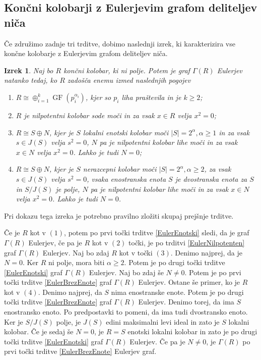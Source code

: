 \documentclass[a4paper, 12pt]{amsart}
\theoremstyle{definition} %
\theoremstyle{plain} %
\newtheorem{izrek}[definicija]{Izrek}
\DeclareMathOperator{\GF}{GF}
\begin{document}
\endproof


\subsection{Končni kolobarji z Eulerjevim grafom deliteljev niča}

Če združimo zadnje tri trditve, dobimo naslednji izrek, ki karakterizira vse končne kolobarje z Eulerjevim grafom deliteljev niča.

\begin{izrek}
\label{EulerGraf}
Naj bo $R$ končni kolobar, ki ni polje. Potem je graf $\Gamma(R)$ Eulerjev natanko tedaj, ko $R$ zadošča enemu izmed naslednjih pogojev
\begin{enumerate}
\item $R \cong \oplus_{i=1}^k \GF(p_i^{\alpha_i})$, kjer so $p_i$ liha praštevila in je $k\ge 2$;
\item $R$ je nilpotentni kolobar sode moči in za vsak $x\in R$ velja $x^2 = 0$;
\item $R\cong S\oplus N$, kjer je $S$ lokalni enotski kolobar moči $|S| = 2^{\alpha}, \alpha \ge 1$ in za vsak $s\in J(S)$ velja $s^2 = 0$, $N$ pa je nilpotentni kolobar lihe moči in za vsak $x\in N$ velja $x^2 = 0$. Lahko je tudi $N=0$;
\item $R\cong S \oplus N$, kjer je $S$ nerazcepni kolobar moči $|S| = 2^{\alpha}, \alpha \ge 2$, za vsak $s\in J(S)$ velja $s^2 = 0$, vsaka enostranska enota $S$ je dvostranska enota za $S$ in $S/J(S)$ je polje, $N$ pa je nilpotentni kolobar lihe moči in za vsak $x\in N$ velja $x^2 = 0$. Lahko je tudi $N=0$.
\end{enumerate} 
\end{izrek}

\proof
Pri dokazu tega izreka je potrebno pravilno zložiti skupaj prejšnje trditve. 

Če je $R$ kot v $(1)$, potem po prvi točki trditve \ref{EulerEnotski} sledi, da je graf $\Gamma(R)$ Eulerjev, če pa je $R$ kot v $(2)$ točki, je po trditvi \ref{EulerNilpotenten} graf $\Gamma(R)$ Eulerjev. Naj bo zdaj $R$ kot v točki $(3)$. Denimo najprej, da je $N=0$. Ker $R$ ni polje, mora biti $\alpha \ge 2$. Potem je po drugi točki trditve \ref{EulerEnotski} graf $\Gamma(R)$ Eulerjev. Naj bo zdaj še $N\neq 0$. Potem je po prvi točki trditve \ref{EulerBrezEnote} graf $\Gamma(R)$ Eulerjev. Ostane še primer, ko je $R$ kot v $(4)$. Denimo najprej, da $S$ nima enostranske enote. Potem je po drugi točki trditve \ref{EulerBrezEnote} graf $\Gamma(R)$ Eulerjev. Denimo torej, da ima $S$ enostransko enoto. Po predpostavki to pomeni, da ima tudi dvostransko enoto. Ker je $S/J(S)$ polje, je $J(S)$ edini maksimalni levi ideal in zato je $S$ lokalni kolobar. Če je sedaj še $N=0$, je $R=S$ enotski lokalni kolobar in zato je po drugi točki trditve \ref{EulerEnotski} graf $\Gamma(R)$ Eulerjev. Če pa je $N\neq 0$, je $\Gamma(R)$ po prvi točki trditve \ref{EulerBrezEnote} Eulerjev graf.
\end{document}
